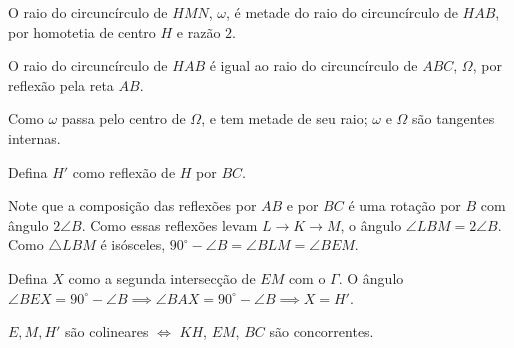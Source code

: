 \documentclass[10pt,a4paper]{article}
\begin{document}
	\begin{sol}
		O raio do circuncírculo de $HMN$, $\omega$, é metade do raio do circuncírculo de $HAB$, por homotetia de centro $H$ e razão $2$.

		O raio do circuncírculo de $HAB$ é igual ao raio do circuncírculo de $ABC$, $\Omega$, por reflexão pela reta $AB$.

		Como $\omega$ passa pelo centro de $\Omega$, e tem metade de seu raio; $\omega$ e $\Omega$ são tangentes internas.
	\end{sol}

	\begin{sol}
		Defina $H'$ como reflexão de $H$ por $BC$.


		Note que a composição das reflexões por $AB$ e por $BC$ é uma rotação por  $B$ com ângulo $2\angle B$. Como essas reflexões levam $L \to K \to M$, o ângulo $\angle LBM = 2\angle B$. Como $\triangle LBM$ é isósceles, $90^\circ - \angle B = \angle BLM = \angle BEM$.

		Defina $X$ como a segunda intersecção de $EM$ com o $\Gamma$. O ângulo $\angle BEX = 90^\circ - \angle B \implies \angle BAX = 90^\circ - \angle B \implies X = H'$.

		$E, M, H'$ são colineares $\iff$ $KH$, $EM$, $BC$ são concorrentes.
	\end{sol}
\end{document}
